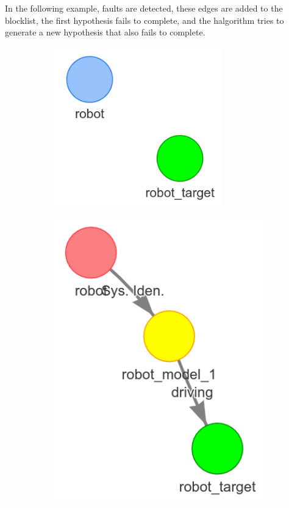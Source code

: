 In the following example,  faults are detected, these edges are added to the blocklist, the first hypothesis fails to complete, and the \ac{halgorithm} tries to generate a new hypothesis that also fails to complete.\bs

\begin{figure}[H]
    \centering
    \begin{subfigure}{.3\textwidth}
    \centering
    \includegraphics[width=0.8\textwidth]{figures/proposed_method/connecting_nodes/failure/fail_1}
    \end{subfigure}
    \begin{subfigure}{.3\textwidth}
    \centering
    \includegraphics[width=1.05\textwidth]{figures/proposed_method/connecting_nodes/failure/fail_2}

\end{subfigure}
\end{figure}
